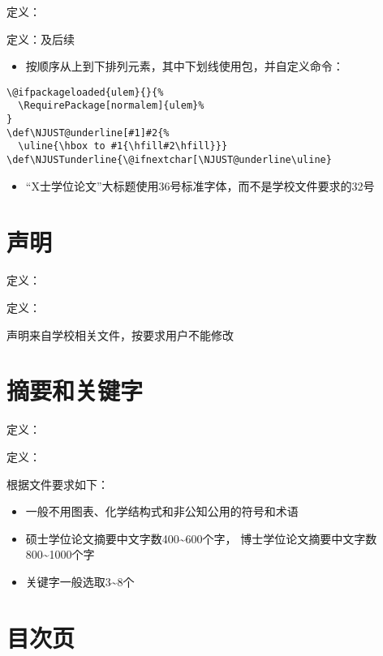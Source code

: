 定义：\redstar

定义：及后续


\begin{itemize}
    \item 按顺序从上到下排列元素，其中下划线使用包，并自定义命令：
\end{itemize}

\begin{lstlisting}[style=mylatex]
%% underline - check if ulem package is loaded
\@ifpackageloaded{ulem}{}{%
  \RequirePackage[normalem]{ulem}%
}
\def\NJUST@underline[#1]#2{%
  \uline{\hbox to #1{\hfill#2\hfill}}}
\def\NJUSTunderline{\@ifnextchar[\NJUST@underline\uline}
\end{lstlisting}

\begin{itemize}
    \item “X士学位论文”大标题使用36号标准字体，而不是学校文件要求的32号
\end{itemize}

\section{声明}
定义： \prohibit

定义：

声明来自学校相关文件\cite{2014njust_thesis}，按要求用户不能修改

\section{摘要和关键字}

定义： \redstar

定义：

根据文件要求如下：
\begin{itemize}
  \item 一般不用图表、化学结构式和非公知公用的符号和术语
  \item 硕士学位论文摘要中文字数400\textasciitilde600个字，
  博士学位论文摘要中文字数800\textasciitilde1000个字
  \item 关键字一般选取3\textasciitilde8个
\end{itemize}

\section{目次页}

